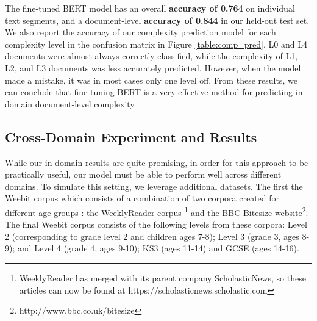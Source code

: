 \documentclass[thesis.tex]{subfiles}
\begin{document}
The fine-tuned BERT model has an overall {\bf accuracy of 0.764} on individual text segments, and a document-level {\bf accuracy of 0.844} in our held-out test set. We also report the accuracy of our complexity prediction model for each complexity level in the confusion matrix in Figure \ref{table:comp_pred}. L0 and L4 documents were almost always correctly classified, while the complexity of L1, L2, and L3 documents was less accurately predicted. However, when the model made a mistake, it was in most cases only one level off. From these results, we can conclude that fine-tuning BERT is a very effective method for predicting in-domain document-level complexity.

\subsection{Cross-Domain Experiment and Results}

While our in-domain results are quite promising, in order for this approach to be practically useful, our model must be able to perform well across different domains. To simulate this setting, we leverage additional datasets. The first the Weebit corpus which consists of a combination of two corpora created for different age groups \citep{vajjala2012improving}: the WeeklyReader corpus \footnote{WeeklyReader has merged with its parent company ScholasticNews, so these articles can now be found at https://scholasticnews.scholastic.com} and the BBC-Bitesize website\footnote{http://www.bbc.co.uk/bitesize}.  The final Weebit corpus consists of the following levels from these corpora: Level 2 (corresponding to grade level 2 and children ages 7-8); Level 3 (grade 3, ages 8-9); and Level 4 (grade 4, ages 9-10); KS3 (ages 11-14) and GCSE (ages 14-16).

\end{document}
